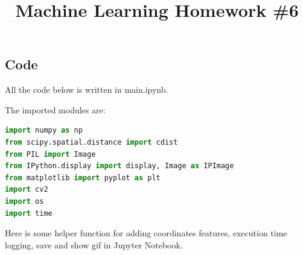 \documentclass{homework}
\begin{document}
\title{Machine Learning Homework \#6}
\author{\chineseName \masterStudentID}
\date{}
\maketitle

\subsection{Code}

All the code below is written in main.ipynb.

The imported modules are:

\begin{lstlisting}[language=Python]
import numpy as np
from scipy.spatial.distance import cdist
from PIL import Image
from IPython.display import display, Image as IPImage
from matplotlib import pyplot as plt
import cv2
import os
import time
\end{lstlisting}

Here is some helper function for adding coordinates features, execution time logging, save and show gif in Jupyter Notebook.
\end{document}
